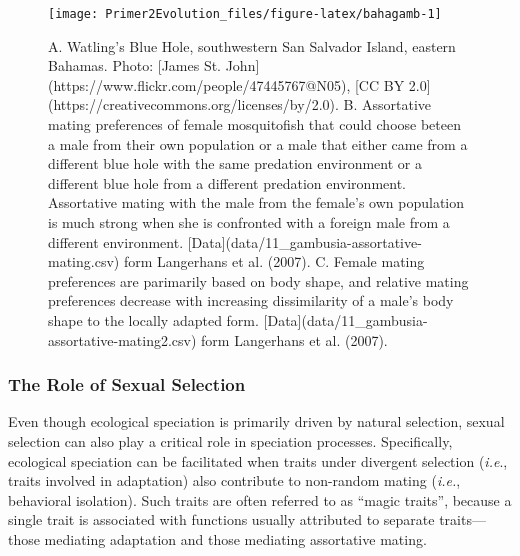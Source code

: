 \documentclass[
]{book}
\begin{document}
\begin{figure}
\texttt{[image: Primer2Evolution\_files/figure-latex/bahagamb-1]} \caption{A. Watling's Blue Hole, southwestern San Salvador Island, eastern Bahamas. Photo: [James St. John](https://www.flickr.com/people/47445767@N05), [CC BY 2.0](https://creativecommons.org/licenses/by/2.0). B. Assortative mating preferences of female mosquitofish that could choose beteen a male from their own population or a male that either came from a different blue hole with the same predation environment or a different blue hole from a different predation environment. Assortative mating with the male from the female's own population is much strong when she is confronted with a foreign male from a different environment. [Data](data/11_gambusia-assortative-mating.csv) form Langerhans et al. (2007). C. Female mating preferences are parimarily based on body shape, and relative mating preferences decrease with increasing dissimilarity of a male's body shape to the locally adapted form. [Data](data/11_gambusia-assortative-mating2.csv) form Langerhans et al. (2007).}\label{fig:bahagamb}
\end{figure}

\hypertarget{the-role-of-sexual-selection}{%
\subsubsection*{The Role of Sexual Selection}\label{the-role-of-sexual-selection}}

Even though ecological speciation is primarily driven by natural selection, sexual selection can also play a critical role in speciation processes. Specifically, ecological speciation can be facilitated when traits under divergent selection (\emph{i.e}., traits involved in adaptation) also contribute to non-random mating (\emph{i.e.}, behavioral isolation). Such traits are often referred to as ``magic traits'', because a single trait is associated with functions usually attributed to separate traits---those mediating adaptation and those mediating assortative mating.
\end{document}
